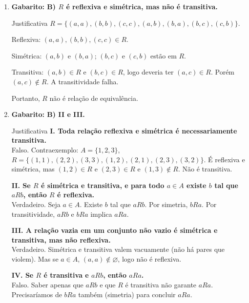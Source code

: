 \documentclass[12pt]{article}
\begin{document}
\begin{enumerate}
\begin{block}{Justificativa}
\textbf{$R_2$: $a - b$ múltiplo de 2.} É relação de equivalência (mesma paridade). Mas a alternativa A já é a correta.

\textbf{$R_3$: $a \neq b$.} Não é reflexiva ($a \neq a$ é falso). Não é transitiva: $1 \neq 2$ e $2 \neq 1$, mas $1 = 1$ (falha).
\end{block}

\vspace{0.8cm}

\item \textbf{Gabarito: B) $R$ é reflexiva e simétrica, mas não é transitiva.}

\begin{block}{Justificativa}
$R = \{(a,a),(b,b),(c,c),(a,b),(b,a),(b,c),(c,b)\}$.

Reflexiva: $(a,a), (b,b), (c,c) \in R$. \checkmark

Simétrica: $(a,b)$ e $(b,a)$; $(b,c)$ e $(c,b)$ estão em $R$. \checkmark

Transitiva: $(a,b) \in R$ e $(b,c) \in R$, logo deveria ter $(a,c) \in R$. Porém $(a,c) \notin R$. A transitividade falha.

Portanto, $R$ não é relação de equivalência.
\end{block}

\vspace{0.8cm}

\item \textbf{Gabarito: B) II e III.}

\begin{block}{Justificativa}
\textbf{I. Toda relação reflexiva e simétrica é necessariamente transitiva.}\\
Falso. Contraexemplo: $A=\{1,2,3\}$, $R=\{(1,1),(2,2),(3,3),(1,2),(2,1),(2,3),(3,2)\}$. É reflexiva e simétrica, mas $(1,2)\in R$ e $(2,3)\in R$ e $(1,3)\notin R$. Não é transitiva.

\textbf{II. Se $R$ é simétrica e transitiva, e para todo $a \in A$ existe $b$ tal que $aRb$, então $R$ é reflexiva.}\\
Verdadeiro. Seja $a \in A$. Existe $b$ tal que $aRb$. Por simetria, $bRa$. Por transitividade, $aRb$ e $bRa$ implica $aRa$.

\textbf{III. A relação vazia em um conjunto não vazio é simétrica e transitiva, mas não reflexiva.}\\
Verdadeiro. Simétrica e transitiva valem vacuamente (não há pares que violem). Mas se $a \in A$, $(a,a) \notin \varnothing$, logo não é reflexiva.

\textbf{IV. Se $R$ é transitiva e $aRb$, então $aRa$.}\\
Falso. Saber apenas que $aRb$ e que $R$ é transitiva não garante $aRa$. Precisaríamos de $bRa$ também (simetria) para concluir $aRa$.
\end{block}

\end{enumerate}
\end{document}
